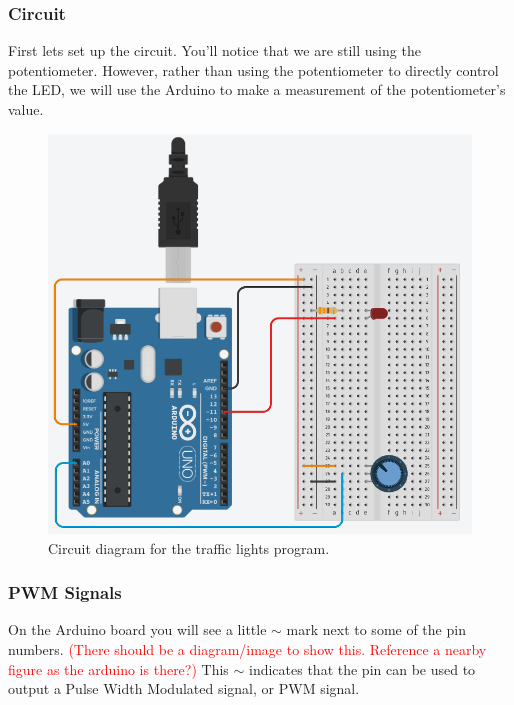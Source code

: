 \documentclass[12pt]{article}
\begin{document}
	\subsubsection{Circuit}
	
	First lets set up the circuit. You'll notice that we are still using the potentiometer. However, rather than using the potentiometer to directly control the LED, we will use the Arduino to make a measurement of the potentiometer's value.
	
	\begin{figure}[H]
		\begin{center}
			\includegraphics[scale=0.5]{LED_brightness_pwm}
			\caption{Circuit diagram for the traffic lights program.}
			\label{fig:circuit_pwm_brightness_ctrl}
		\end{center}
	\end{figure}

	\subsubsection{PWM Signals}
	
	On the Arduino board you will see a little $\sim$ mark next to some of the pin numbers. \textcolor{red}{(There should be a diagram/image to show this. Reference a nearby figure as the arduino is there?)} This $\sim$ indicates that the pin can be used to output a Pulse Width Modulated signal, or PWM signal.
	
\end{document}
